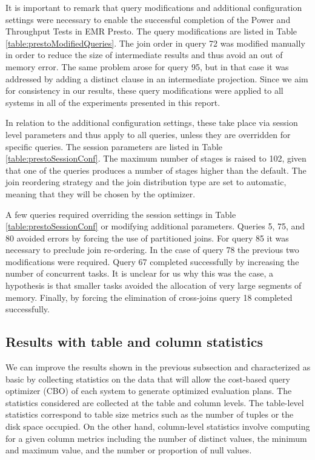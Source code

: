 It is important to remark that query modifications and additional configuration settings were necessary to enable the successful completion of the Power and Throughput Tests in EMR Presto. The query modifications are listed in Table \ref{table:prestoModifiedQueries}. The join order in query 72 was modified manually in order to reduce the size of intermediate results and thus avoid an out of memory error. The same problem arose for query 95, but in that case it was addressed by adding a distinct clause in an intermediate projection. Since we aim for consistency in our results, these query modifications were applied to all systems in all of the experiments presented in this report.

In relation to the additional configuration settings, these take place via session level parameters and thus apply to all queries, unless they are overridden for specific queries. The session parameters are listed in Table \ref{table:prestoSessionConf}. The maximum number of stages is raised to 102, given that one of the queries produces a number of stages higher than the default. The join reordering strategy and the join distribution type are set to automatic, meaning that they will be chosen by the optimizer.

A few queries required overriding the session settings in Table \ref{table:prestoSessionConf} or modifying additional parameters. Queries 5, 75, and 80 avoided errors by forcing the use of partitioned joins. For query 85 it was necessary to preclude join re-ordering. In the case of query 78 the previous two modifications were required. Query 67 completed successfully by increasing the number of concurrent tasks. It is unclear for us why this was the case, a hypothesis is that smaller tasks avoided the allocation of very large segments of memory. Finally, by forcing the elimination of cross-joins query 18 completed successfully. 

\subsection{Results with table and column statistics}\label{statsResults}

We can improve the results shown in the previous subsection and characterized as basic by collecting statistics on the data that will allow the cost-based query optimizer (CBO) of each system to generate optimized evaluation plans. The statistics considered are collected at the table and column levels. The table-level statistics correspond to table size metrics such as the number of tuples or the disk space occupied. On the other hand, column-level statistics involve computing for a given column metrics including the number of distinct values, the minimum and maximum value, and the number or proportion of null values.

